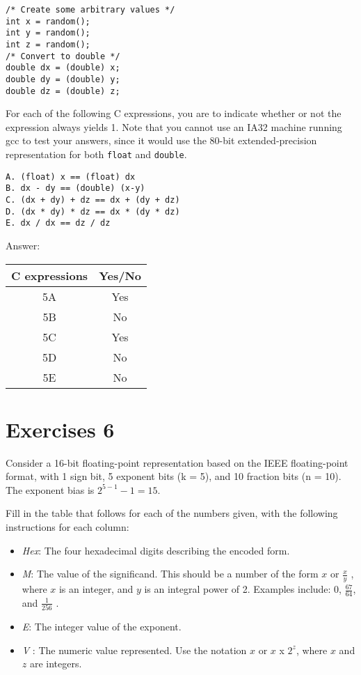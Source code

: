 \documentclass[a4paper]{article}
\begin{document}
\begin{verbatim}
/* Create some arbitrary values */
int x = random();
int y = random();
int z = random();
/* Convert to double */
double dx = (double) x;
double dy = (double) y;
double dz = (double) z;
\end{verbatim}

For each of the following C expressions, you are to indicate whether or not the expression always yields 1. Note that you cannot use an IA32 machine running gcc to test your answers, since it would use the 80-bit extended-precision representation for both \texttt{float} and \texttt{double}.

\begin{verbatim}
A. (float) x == (float) dx
B. dx - dy == (double) (x-y)
C. (dx + dy) + dz == dx + (dy + dz)
D. (dx * dy) * dz == dx * (dy * dz)
E. dx / dx == dz / dz
\end{verbatim}

Answer: %

\begin{table}[ht]
\begin{tabular}{|c|c|}
\hline
C expressions&Yes/No\\
\hline
5A & Yes \\
\hline
5B & No \\
\hline
5C & Yes \\
\hline
5D & No \\
\hline
5E & No \\
\hline
\end{tabular}
\end{table}

\section{Exercises 6}
Consider a 16-bit floating-point representation based on the IEEE floating-point format, with 1 sign bit, 5 exponent bits (k = 5), and 10 fraction bits (n = 10). The exponent bias is $2^{5-1} - 1= 15$.

Fill in the table that follows for each of the numbers given, with the following instructions for each column:
\begin{itemize}
\item \textit{Hex}: The four hexadecimal digits describing the encoded form.
\item \textit{M}: The value of the significand. This should be a number of the form $x$ or $\frac{x}{y}$ , where $x$ is an integer, and $y$ is an integral power of 2. Examples include: 0, $\frac{67}{64}$, and $\frac{1}{256}$ .
\item \textit{E}: The integer value of the exponent.
\item \textit{V} : The numeric value represented. Use the notation $x$ or
$x$ x $2^z$, where $x$ and $z$ are integers.
\end{itemize}
\end{document}
